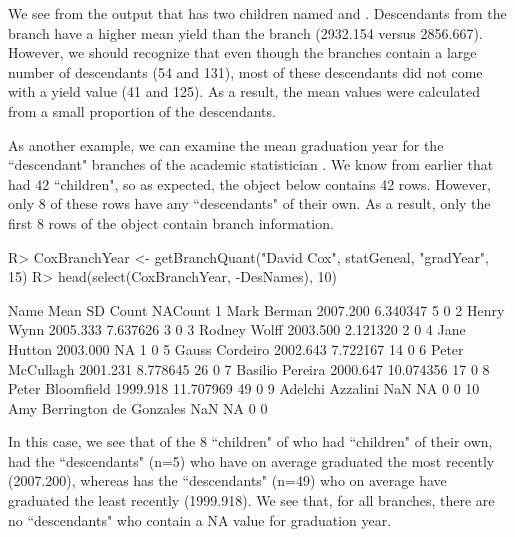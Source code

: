 \documentclass[article,shortnames]{jss}
\begin{document}
We see from the output that  has two children named  and . Descendants from the  branch have a higher mean yield than the  branch (2932.154 versus 2856.667). However, we should recognize that even though the branches contain a large number of descendants (54 and 131), most of these descendants did not come with a yield value (41 and 125). As a result, the mean values were calculated from a small proportion of the descendants.

As another example, we can examine the mean graduation year for the ``descendant" branches of the academic statistician . We know from earlier that  had 42 ``children", so as expected, the  object below contains 42 rows. However, only 8 of these rows have any ``descendants" of their own. As a result, only the first 8 rows of the  object contain branch information.

\begin{CodeChunk}
\begin{CodeInput}
R> CoxBranchYear <- getBranchQuant("David Cox", statGeneal, "gradYear", 15)
R> head(select(CoxBranchYear, -DesNames), 10)
\end{CodeInput}
\begin{CodeOutput}
                         Name     Mean        SD Count NACount
1                 Mark Berman 2007.200  6.340347     5       0
2                  Henry Wynn 2005.333  7.637626     3       0
3                Rodney Wolff 2003.500  2.121320     2       0
4                 Jane Hutton 2003.000        NA     1       0
5              Gauss Cordeiro 2002.643  7.722167    14       0
6             Peter McCullagh 2001.231  8.778645    26       0
7             Basilio Pereira 2000.647 10.074356    17       0
8            Peter Bloomfield 1999.918 11.707969    49       0
9            Adelchi Azzalini      NaN        NA     0       0
10 Amy Berrington de Gonzales      NaN        NA     0       0
\end{CodeOutput}
\end{CodeChunk}

In this case, we see that of the 8 ``children" of  who had ``children" of their own,  had the ``descendants" (n=5) who have on average graduated the most recently (2007.200), whereas  has the ``descendants" (n=49) who on average have graduated the least recently (1999.918). We see that, for all branches, there are no ``descendants" who contain a NA value for graduation year.
\end{document}
